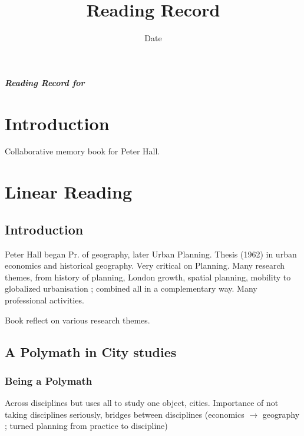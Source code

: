 


\title{Reading Record\bigskip\\
\cite{knowles2016sir}
}
\author{}
\date{Date}


\maketitle

\textbf{\textit{Reading Record for \cite{knowles2016sir}}}




\section{Introduction}

Collaborative memory book for Peter Hall. 


\section{Linear Reading}

\subsection{Introduction}

Peter Hall began Pr. of geography, later Urban Planning. Thesis (1962) in urban economics and historical geography. Very critical on Planning. Many research themes, from history of planning, London growth, spatial planning, mobility to globalized urbanisation ; combined all in a complementary way. Many professional activities.

Book reflect on various research themes.

\subsection{A Polymath in City studies}

\subsubsection{Being a Polymath}

Across disciplines but uses all to study one object, cities. Importance of not taking disciplines seriously, bridges between disciplines (economics $\rightarrow$ geography ; turned planning from practice to discipline)

